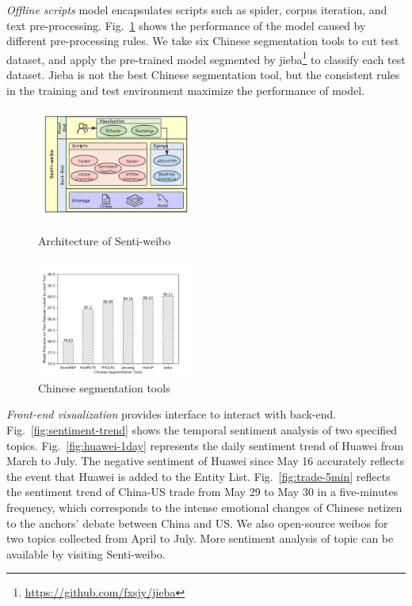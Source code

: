 \documentclass[runningheads]{llncs}
\begin{document}
\textit{Offline scripts} model encapsulates scripts such as spider, corpus iteration, and text pre-processing. Fig.~\ref{fig:segmentation-tools-precision} shows the performance of the model caused by different pre-processing rules. We take six Chinese segmentation tools to cut test dataset, and apply the pre-trained model segmented by jieba\footnote{\url{https://github.com/fxsjy/jieba}} to classify each test dataset. Jieba is not the best Chinese segmentation tool, but the consistent rules in the training and test environment maximize the performance of model.

\begin{figure}[htbp]
\vspace{-0.5cm}   %
\centering
\begin{minipage}[t]{0.43\textwidth}
\centering
\includegraphics[width=5.2cm]{images/Architecture-of-Senti-weibo-3.png}
\caption{Architecture of Senti-weibo}
\label{fig:Senti-weibo}
\end{minipage}
\begin{minipage}[t]{0.43\textwidth}
\centering
\includegraphics[width=5.2cm]{images/model-precision-on-test-dataset-cutted-by-each-tool.png}
\caption{Chinese segmentation tools}
\label{fig:segmentation-tools-precision}
\end{minipage}
\end{figure}

\textit{Front-end visualization} provides interface to interact with back-end. Fig.~\ref{fig:sentiment-trend} shows the temporal sentiment analysis of two specified topics. Fig.~\ref{fig:huawei-1day} represents the daily sentiment trend of Huawei from March to July. The negative sentiment of Huawei since May 16 accurately reflects the event that Huawei is added to the Entity List. Fig.~\ref{fig:trade-5min} reflects the sentiment trend of China-US trade from May 29 to May 30 in a five-minutes frequency, which corresponds to the intense emotional changes of Chinese netizen to the anchors' debate between China and US. We also open-source weibos for two topics collected from April to July. More sentiment analysis of topic can be available by visiting Senti-weibo. 
\end{document}
